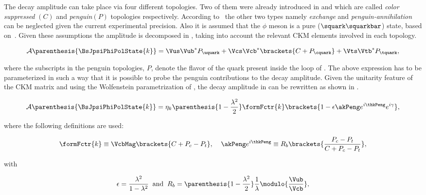 The \BsJpsiPhi decay amplitude can take place via four different topologies.
Two of them were already introduced in  and  which are called {\it color suppressed }$(C)$ and {\it penguin}$(P)$
topologies respectively. According to~\cite{DeBruyn-thesis} the other two types namely {\it exchange} and {\it penguin-annihilation} can be neglected
given the current experimental precision. Also it is assumed that the $\phi$ meson is a pure ($\squark\squarkbar$) state, based on~\cite{Faller:2008gt}.
Given these assumptions the \BsJpsiPhi amplitude is decomposed in , taking into account the relevant CKM elements involved in each topology.

\begin{equation}
\mathcal{A} \parenthesis{\BsJpsiPhiPolState{k}} = \Vus\Vub^*P_{\uquark} + \Vcs\Vcb^*\brackets{C +P_{\cquark}} + \Vts\Vtb^*P_{\tquark},
 \label{bsjpsiphi_amp}
\end{equation}

\noindent where the subscripts in the penguin topologies, $P$, denote the flavor of the quark present inside the loop of .
The above expression has to be parameterized in such a way that it is possible to probe the penguin contributions to
the \BsJpsiPhi decay amplitude. Given the unitarity feature of the CKM matrix and using the Wolfenstein parametrization
of , the decay amplitude in  can be rewritten as shown in .

\begin{equation}
  \mathcal{A} \parenthesis{\BsJpsiPhiPolState{k}} = \eta_k  \parenthesis{1-\frac{\lambda^2}{2}} \formFctr{k} \brackets{ 1 - \epsilon \akPeng e^{i\thkPeng} e^{i\gamma} },
 \label{bsjpsiphi_amp_param}
\end{equation}

\noindent where the following definitions are used:

\begin{equation}
  \formFctr{k} \equiv \VcbMag \brackets{C + P_c - P_t}, \;\;\;\; \akPeng e^{i\thkPeng} \equiv R_b \brackets{ \frac{P_c - P_t}{C + P_c - P_t} },
  \label{bsjpsiphi_amp_param_defs}
\end{equation}

\noindent with

\begin{equation}
  \epsilon = \frac{\lambda^2}{1-\lambda^2} \;\;\text{and} \;\;  R_b = \parenthesis{1-\frac{\lambda^2}{2}} \frac{1}{\lambda} \modulo{\frac{\Vub}{\Vcb}},
  \label{bsjpsiphi_amp_param_defs_II}
\end{equation}

